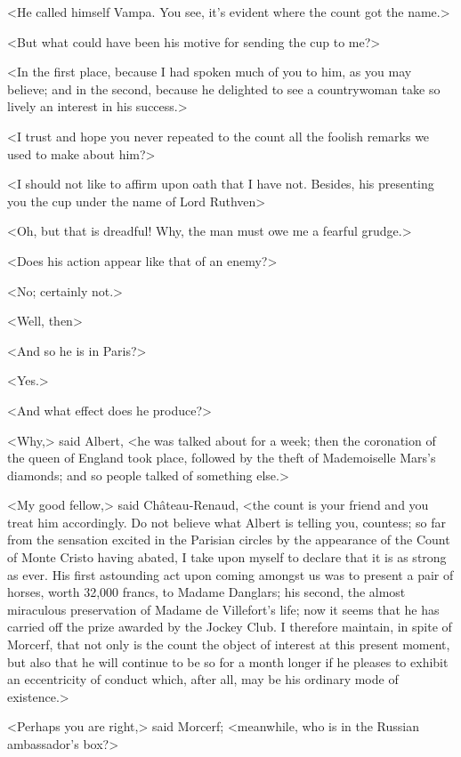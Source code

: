  <He called himself Vampa. You see, it's evident where the count got the name.> 

 <But what could have been his motive for sending the cup to me?> 

 <In the first place, because I had spoken much of you to him, as you may believe; and in the second, because he delighted to see a countrywoman take so lively an interest in his success.> 

 <I trust and hope you never repeated to the count all the foolish remarks we used to make about him?> 

 <I should not like to affirm upon oath that I have not. Besides, his presenting you the cup under the name of Lord Ruthven\longdash> 

 <Oh, but that is dreadful! Why, the man must owe me a fearful grudge.> 

 <Does his action appear like that of an enemy?> 

 <No; certainly not.> 

 <Well, then\longdash> 

 <And so he is in Paris?> 

 <Yes.> 

 <And what effect does he produce?> 

 <Why,> said Albert, <he was talked about for a week; then the coronation of the queen of England took place, followed by the theft of Mademoiselle Mars's diamonds; and so people talked of something else.> 

 <My good fellow,> said Château-Renaud, <the count is your friend and you treat him accordingly. Do not believe what Albert is telling you, countess; so far from the sensation excited in the Parisian circles by the appearance of the Count of Monte Cristo having abated, I take upon myself to declare that it is as strong as ever. His first astounding act upon coming amongst us was to present a pair of horses, worth 32,000 francs, to Madame Danglars; his second, the almost miraculous preservation of Madame de Villefort's life; now it seems that he has carried off the prize awarded by the Jockey Club. I therefore maintain, in spite of Morcerf, that not only is the count the object of interest at this present moment, but also that he will continue to be so for a month longer if he pleases to exhibit an eccentricity of conduct which, after all, may be his ordinary mode of existence.> 

 <Perhaps you are right,> said Morcerf; <meanwhile, who is in the Russian ambassador's box?> 

